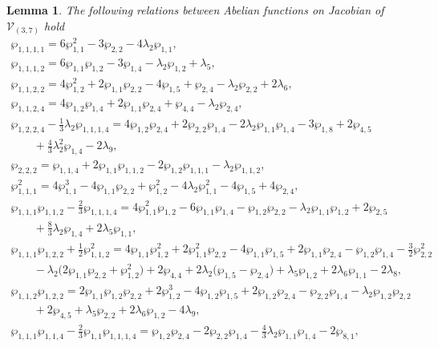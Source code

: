 \documentclass[pdftex]{sigma}
\numberwithin{equation}{section}
\newtheorem{Lemma}[Theorem]{Lemma}
\begin{document}
\begin{Lemma}\label{L:ind4WPC37}
The following relations between Abelian functions on Jacobian of $\mathcal{V}_{(3,7)}$ hold
\begin{gather*}
 \wp_{1,1,1,1} = 6 \wp_{1,1}^2 - 3\wp_{2,2} - 4 \lambda_2 \wp_{1,1}, \\
 \wp_{1,1,1,2} = 6\wp_{1,1}\wp_{1,2} - 3 \wp_{1,4} - \lambda_2 \wp_{1,2} + \lambda_5, \\
 \wp_{1,1,2,2} = 4\wp_{1,2}^2 + 2\wp_{1,1}\wp_{2,2} - 4\wp_{1,5} + \wp_{2,4} - \lambda_2 \wp_{2,2} + 2\lambda_6, \\
 \wp_{1,1,2,4} = 4\wp_{1,2}\wp_{1,4} + 2\wp_{1,1}\wp_{2,4} + \wp_{4,4} - \lambda_2 \wp_{2,4}, \\
 \wp_{1,2,2,4} - \tfrac{1}{3}\lambda_2\wp_{1,1,1,4} = 4 \wp_{1,2} \wp_{2,4} + 2 \wp_{2,2} \wp_{1,4} - 2 \lambda_2 \wp_{1,1} \wp_{1,4} - 3\wp_{1,8} + 2\wp_{4,5}\\
 \qquad {} + \tfrac{4}{3} \lambda_2^2 \wp_{1,4} - 2\lambda_9, \\
 \wp_{2,2,2} = \wp_{1,1,4} + 2 \wp_{1,1}\wp_{1,1,2} - 2 \wp_{1,2}\wp_{1,1,1} - \lambda_2 \wp_{1,1,2}, \\
 \wp_{1,1,1}^2 = 4\wp_{1,1}^3 - 4\wp_{1,1}\wp_{2,2} + \wp_{1,2}^2 - 4\lambda_2 \wp_{1,1}^2 - 4\wp_{1,5} + 4\wp_{2,4}, \\
 \wp_{1,1,1}\wp_{1,1,2} - \tfrac{2}{3}\wp_{1,1,1,4} = 4 \wp_{1,1}^2 \wp_{1,2} - 6 \wp_{1,1}\wp_{1,4} - \wp_{1,2}\wp_{2,2} - \lambda_2 \wp_{1,1}\wp_{1,2} + 2\wp_{2,5} \\
 \qquad{} + \tfrac{8}{3} \lambda_2 \wp_{1,4} + 2\lambda_5 \wp_{1,1}, \\
 \wp_{1,1,1}\wp_{1,2,2} + \tfrac{1}{2} \wp_{1,1,2}^2 = 4 \wp_{1,1} \wp_{1,2}^2 + 2 \wp_{1,1}^2 \wp_{2,2} -4\wp_{1,1} \wp_{1,5} + 2\wp_{1,1} \wp_{2,4} - \wp_{1,2} \wp_{1,4} - \tfrac{3}{2} \wp_{2,2}^2 \\
 \qquad{} - \lambda_2 \big(2 \wp_{1,1} \wp_{2,2} + \wp_{1,2}^2\big) + 2\wp_{4,4} + 2\lambda_2 \big(\wp_{1,5} - \wp_{2,4}\big) + \lambda_5 \wp_{1,2} + 2\lambda_6 \wp_{1,1} - 2\lambda_8, \\
 \wp_{1,1,2}\wp_{1,2,2} = 2\wp_{1,1}\wp_{1,2}\wp_{2,2} + 2 \wp_{1,2}^3 - 4\wp_{1,2} \wp_{1,5} + 2 \wp_{1,2} \wp_{2,4} - \wp_{2,2} \wp_{1,4} - \lambda_2 \wp_{1,2}\wp_{2,2} \\
 \qquad {} + 2 \wp_{4,5} + \lambda_5 \wp_{2,2} + 2\lambda_6 \wp_{1,2} - 4\lambda_9, \\
 \wp_{1,1,1}\wp_{1,1,4} - \tfrac{2}{3} \wp_{1,1} \wp_{1,1,1,4} = \wp _{1,2} \wp _{2,4} - 2\wp_{2,2} \wp_{1,4} - \tfrac{4}{3} \lambda_2 \wp _{1,1} \wp_{1,4} - 2 \wp_{8,1}, \\

\end{gather*}
\end{Lemma}
\end{document}
